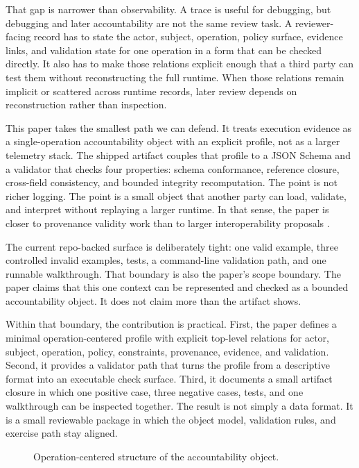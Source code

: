 \documentclass[conference]{IEEEtran}
\begin{document}
That gap is narrower than observability. A trace is useful for debugging, but debugging and later accountability are not the same review task. A reviewer-facing record has to state the actor, subject, operation, policy surface, evidence links, and validation state for one operation in a form that can be checked directly. It also has to make those relations explicit enough that a third party can test them without reconstructing the full runtime. When those relations remain implicit or scattered across runtime records, later review depends on reconstruction rather than inspection.

This paper takes the smallest path we can defend. It treats execution evidence as a single-operation accountability object with an explicit profile, not as a larger telemetry stack. The shipped artifact couples that profile to a JSON Schema and a validator that checks four properties: schema conformance, reference closure, cross-field consistency, and bounded integrity recomputation. The point is not richer logging. The point is a small object that another party can load, validate, and interpret without replaying a larger runtime. In that sense, the paper is closer to provenance validity work than to larger interoperability proposals \cite{moreau2013provdm,cheney2013provconstraints}.

The current repo-backed surface is deliberately tight: one valid example, three controlled invalid examples, tests, a command-line validation path, and one runnable walkthrough. That boundary is also the paper's scope boundary. The paper claims that this one context can be represented and checked as a bounded accountability object. It does not claim more than the artifact shows.

Within that boundary, the contribution is practical. First, the paper defines a minimal operation-centered profile with explicit top-level relations for actor, subject, operation, policy, constraints, provenance, evidence, and validation. Second, it provides a validator path that turns the profile from a descriptive format into an executable check surface. Third, it documents a small artifact closure in which one positive case, three negative cases, tests, and one walkthrough can be inspected together. The result is not simply a data format. It is a small reviewable package in which the object model, validation rules, and exercise path stay aligned.

\begin{figure}[t]
\centering
{}
\caption{Operation-centered structure of the accountability object.}
\label{fig:profile}
\end{figure}
\end{document}
